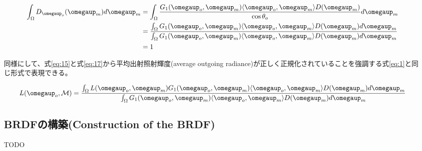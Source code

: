 \documentclass[a4paper,xelatex,ja=standard]{bxjsarticle}
\begin{document}
\begin{equation}
    \begin{split}
        \int_\Omega D_{\boldsymbol{\omegaup}_o}(\boldsymbol{\omegaup}_m) d\boldsymbol{\omegaup}_m
        &= \int_\Omega \frac{G_1(\boldsymbol{\omegaup}_o, \boldsymbol{\omegaup}_m) \langle \boldsymbol{\omegaup}_o, \boldsymbol{\omegaup}_m \rangle D(\boldsymbol{\omegaup}_m)}{\cos\theta_o} d\boldsymbol{\omegaup}_m \\
        &= \frac{\int_\Omega G_1(\boldsymbol{\omegaup}_o, \boldsymbol{\omegaup}_m) \langle \boldsymbol{\omegaup}_o, \boldsymbol{\omegaup}_m \rangle D(\boldsymbol{\omegaup}_m) d\boldsymbol{\omegaup}_m}{\int_\Omega G_1(\boldsymbol{\omegaup}_o, \boldsymbol{\omegaup}_m) \langle \boldsymbol{\omegaup}_o, \boldsymbol{\omegaup}_m \rangle D(\boldsymbol{\omegaup}_m)d \boldsymbol{\omegaup}_m} \\
        &= 1
    \end{split}
    \label{eq:18}
\end{equation}

同様にして、式\eqref{eq:15}と式\eqref{eq:17}から平均出射照射輝度(average outgoing radiance)が正しく正規化されていることを強調する式\eqref{eq:1}と同じ形式で表現できる。

\begin{equation}
    L(\boldsymbol{\omegaup}_o, \mathcal{M}) = \frac{\int_\Omega L(\boldsymbol{\omegaup}_o, \boldsymbol{\omegaup}_m) G_1(\boldsymbol{\omegaup}_o, \boldsymbol{\omegaup}_m) \langle \boldsymbol{\omegaup}_o, \boldsymbol{\omegaup}_m \rangle D(\boldsymbol{\omegaup}_m) d \boldsymbol{\omegaup}_m}{\int_\Omega G_1(\boldsymbol{\omegaup}_o, \boldsymbol{\omegaup}_m) \langle \boldsymbol{\omegaup}_o, \boldsymbol{\omegaup}_m \rangle D(\boldsymbol{\omegaup}_m)d \boldsymbol{\omegaup}_m}
    \label{eq:19}
\end{equation}

\subsection{BRDFの構築(Construction of the BRDF)}

TODO
\end{document}
